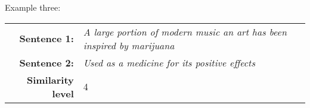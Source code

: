 \noindent Example three: \\
\begin{tabular}{|@{\ }r@{\ \  }p{}|}
\hline
\textbf{Sentence 1:} & \emph{A large portion of modern music an art has been inspired by marijuana}\\
\textbf{Sentence 2:} & \emph{Used as a medicine for its positive effects}\\
\textbf{Similarity level} & 4 \\
\hline
\end{tabular}
